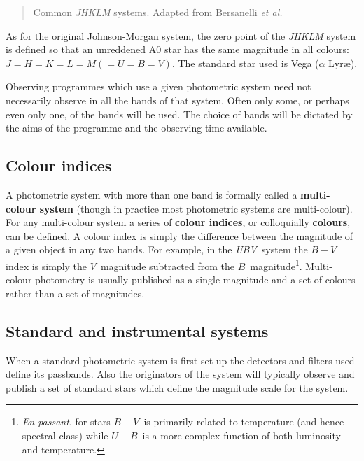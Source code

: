\documentclass[twoside,11pt,nolof]{starlink}
\begin{document}
\begin{description}
\begin{table}[htbp]
  \begin{quote}
  \caption[Common \textit{JHKLM} systems]{Common
   \textit{JHKLM} systems.  Adapted from Bersanelli \textit{et al.}\/\cite{BERSANELLI91}
  \label{IRSYS} }
  \end{quote}

  \end{table}

   As for the original Johnson-Morgan system, the zero point of the
   \textit{JHKLM} system is defined so that an unreddened A0 star has the
   same magnitude in all colours: $J = H = K = L = M (= U = B = V)$.
   The standard star used is Vega ($\alpha$ Lyr\ae ).

\end{description}

Observing programmes which use a given photometric system need not
necessarily observe in all the bands of that system.  Often only some,
or perhaps even only one, of the bands will be used.  The choice of bands
will be dictated by the aims of the programme and the observing time
available.

\subsection{Colour indices}

A photometric system with more than one band is formally called a
\textbf{multi-colour system} (though in practice most photometric systems
are multi-colour).  For any multi-colour system a series of \textbf{colour indices}, or colloquially \textbf{colours}, can be defined.  A
colour index is simply the difference between the magnitude of a given
object in any two bands.  For example, in the \textit{UBV}\, system the
$B - V$\, index is simply the $V$\, magnitude subtracted from the $B$\,
magnitude\footnote{\textit{En passant}, for stars $B - V$\, is primarily
related to temperature (and hence spectral class) while $U - B$\, is a
more complex function of both luminosity and temperature.}.  Multi-colour
photometry is usually published as a single magnitude and a set of
colours rather than a set of magnitudes.

\subsection{Standard and instrumental systems}

When a standard photometric system is first set up the detectors and
filters used define its passbands.  Also the originators of the system
will typically observe and publish a set of standard stars which
define the magnitude scale for the system.
\end{document}
